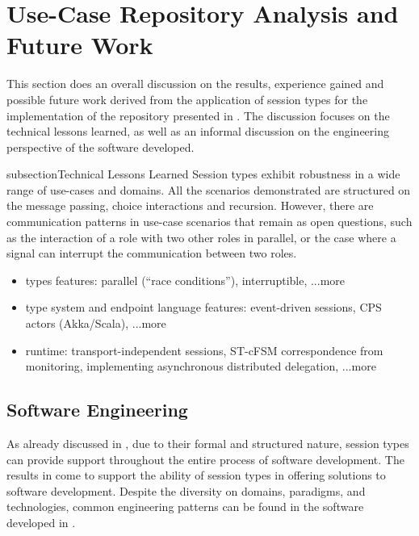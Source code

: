 \section{Use-Case Repository Analysis and Future Work}
\label{sec:session_engineeering}


This section does an overall discussion on the
results, experience gained and possible future work
derived from the application
of session types for the implementation of the
repository presented in .
The discussion focuses on the technical lessons
learned, as well as an informal discussion
on the engineering perspective of the software
developed.

subsection{Technical Lessons Learned}
Session types exhibit robustness in a wide range of
use-cases and domains. All the scenarios demonstrated
are structured on the message passing,
choice interactions and recursion. 
However, there are communication patterns 
in use-case scenarios that remain as open
questions, such as the interaction of a role with two
other roles in parallel, or the case where a signal
can interrupt the communication between two roles.


\begin{itemize}
	\item
	types features: parallel (``race conditions''), interruptible, ...more
	
	\item
	type system and endpoint language features: event-driven sessions, CPS actors (Akka/Scala), ...more
	
	\item
	runtime: transport-independent sessions, ST-cFSM correspondence from monitoring, implementing asynchronous distributed delegation, ...more
\end{itemize}


\subsection{Software Engineering}
As already discussed in ,
due to their formal and structured nature,
session types can provide support throughout the
entire process of software development.
The results in  come to support
the ability of session types in offering solutions
to software development.
%
Despite the diversity on domains, paradigms,
and technologies, common engineering patterns
can be found in the software developed in .

